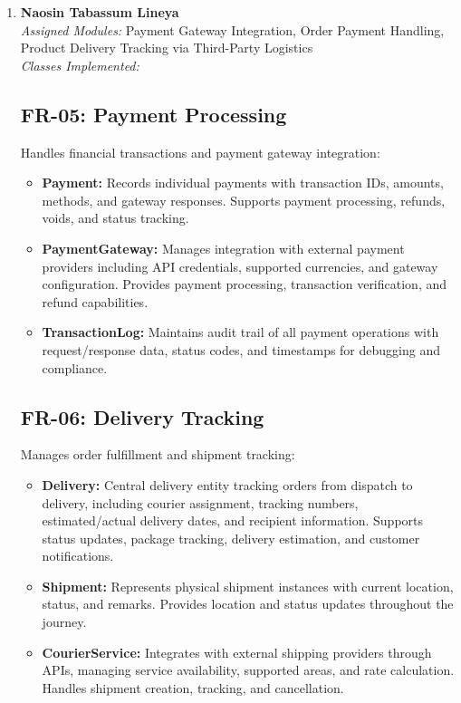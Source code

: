 \begin{enumerate}
\item \textbf{Naosin Tabassum Lineya} \\
\textit{Assigned Modules:} Payment Gateway Integration, Order Payment Handling, Product Delivery Tracking via Third-Party Logistics \\
\textit{Classes Implemented:}
\subsection*{FR-05: Payment Processing}
Handles financial transactions and payment gateway integration:

\begin{itemize}
    \item \textbf{Payment:} Records individual payments with transaction IDs, amounts, methods, and gateway responses. Supports payment processing, refunds, voids, and status tracking.
    
    \item \textbf{PaymentGateway:} Manages integration with external payment providers including API credentials, supported currencies, and gateway configuration. Provides payment processing, transaction verification, and refund capabilities.
    
    \item \textbf{TransactionLog:} Maintains audit trail of all payment operations with request/response data, status codes, and timestamps for debugging and compliance.
\end{itemize}

\subsection*{FR-06: Delivery Tracking}
Manages order fulfillment and shipment tracking:

\begin{itemize}
    \item \textbf{Delivery:} Central delivery entity tracking orders from dispatch to delivery, including courier assignment, tracking numbers, estimated/actual delivery dates, and recipient information. Supports status updates, package tracking, delivery estimation, and customer notifications.
    
    \item \textbf{Shipment:} Represents physical shipment instances with current location, status, and remarks. Provides location and status updates throughout the journey.
    
    \item \textbf{CourierService:} Integrates with external shipping providers through APIs, managing service availability, supported areas, and rate calculation. Handles shipment creation, tracking, and cancellation.
    

\end{itemize}
\end{enumerate}

